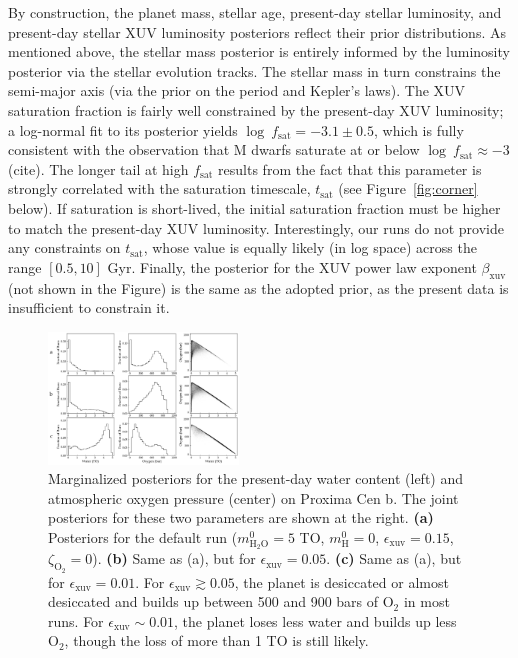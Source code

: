 \documentclass[]{emulateapj}
\newcommand{\note}[1]{{\color{red} #1}}
\newcommand{\cn}{\note{(cite)}}
\begin{document}
By construction, the planet mass, stellar age, present-day stellar luminosity, and present-day stellar XUV luminosity posteriors reflect
their prior distributions. As mentioned above, the stellar mass posterior is entirely informed by the luminosity posterior via the
\cite{YonseiYale13} stellar evolution tracks. The stellar mass in turn constrains the semi-major axis (via the prior on the period and
Kepler's laws). The XUV saturation fraction is fairly well constrained by the present-day XUV luminosity; a log-normal fit
to its posterior yields $\log\ f_\mathrm{sat} = -3.1 \pm 0.5$, which is fully consistent with the observation that M dwarfs
saturate at or below $\log\ f_\mathrm{sat} \approx -3$ \cn. The longer tail at high $f_\mathrm{sat}$ results from the fact that
this parameter is strongly correlated with the saturation timescale, $t_\mathrm{sat}$ (see Figure~\ref{fig:corner} below). If
saturation is short-lived, the initial saturation fraction must be higher to match the present-day XUV luminosity. Interestingly,
our runs do not provide any constraints on $t_\mathrm{sat}$, whose value is equally likely (in log space) across the range 
$[0.5, 10]$ Gyr. Finally, the posterior for the XUV power law exponent $\beta_\mathrm{xuv}$ (not shown in the Figure) is 
the same as the adopted prior, as the present data is insufficient to constrain it.

\begin{figure}[hbt]
  \begin{center}
      \includegraphics[width=0.45\textwidth]{figures/planet_epsilon.pdf}
       \caption{Marginalized posteriors for the present-day water content (left) and atmospheric oxygen
       pressure (center) on Proxima Cen b. The joint posteriors for these two parameters are shown at the 
       right. \textbf{(a)} Posteriors for the default run ($m_\mathrm{H_2O}^0 = 5$ TO, $m_\mathrm{H}^0 = 0$,
       $\epsilon_\mathrm{xuv} = 0.15$, $\zeta_\mathrm{O_2} = 0$). \textbf{(b)} Same as (a), but for
       $\epsilon_\mathrm{xuv} = 0.05$. \textbf{(c)} Same as (a), but for
       $\epsilon_\mathrm{xuv} = 0.01$. For $\epsilon_\mathrm{xuv} \gtrsim 0.05$, the planet is desiccated or
       almost desiccated and builds up between 500 and 900 bars of O$_2$ in most runs. For $\epsilon_\mathrm{xuv} \sim 0.01$,
       the planet loses less water and builds up less O$_2$, though the loss of more than 1 TO is still likely.
       }
     \label{fig:planet_epsilon}
  \end{center}
\end{figure}
\end{document}
